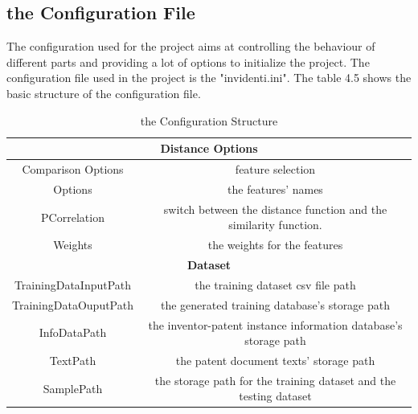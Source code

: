 \subsection{the Configuration File}
The configuration used for the project aims at controlling the behaviour of different parts and providing a lot of options to initialize the project. The configuration file used in the project is the "invidenti.ini". The table 4.5 shows the basic structure of the configuration file.
\begin{table}
\centering
\begin{tabular}{|c|c|}
\hline
\multicolumn{2}{|c|}{\textbf{Distance Options}} \\
\hline
Comparison Options & feature selection   \\
\hline
Options & the features' names \\
\hline
PCorrelation & switch between the distance function and the similarity function. \\
\hline
Weights & the weights for the features\\
\hline
\multicolumn{2}{|c|}{\textbf{Dataset}} \\
\hline
TrainingDataInputPath & the training dataset csv file path \\
\hline
TrainingDataOuputPath& the generated training database's storage path \\
\hline
InfoDataPath & the inventor-patent instance information database's storage path \\
\hline
TextPath & the patent document texts' storage path \\
\hline
SamplePath & the storage path for the training dataset and the testing dataset  \\
\hline
\end{tabular}
\caption{the Configuration Structure}
\end{table}
